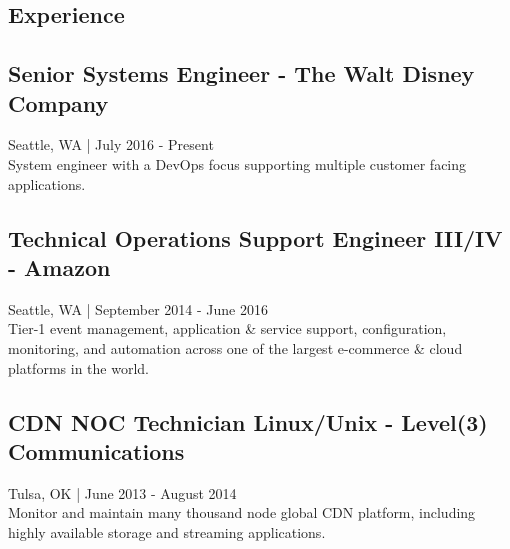 \documentclass[]{mv-resume}
\begin{document}
\begin{minipage}[t]{0.5\textwidth}
\begin{skills}
	\end{skills}
	\begin{experience}
		\hline
		\section*{Experience}
		\subsection*{Senior Systems Engineer - The Walt Disney Company}{Seattle, WA | July 2016 - Present}\\[4pt]
		{System engineer with a DevOps focus supporting multiple customer facing applications.}
		\subsection*{Technical Operations Support Engineer III/IV - Amazon}{Seattle, WA | September 2014 - June 2016}\\[4pt]
		{Tier-1 event management, application \& service support, configuration, monitoring, and automation across one of the largest e-commerce \& cloud platforms in the world.}
		\subsection*{CDN NOC Technician Linux/Unix - Level(3) Communications}{Tulsa, OK | June 2013 - August 2014}\\[4pt]
		{Monitor and maintain many thousand node global CDN platform, including highly available storage and streaming applications.}
	\end{experience}
	\end{minipage}
\end{document}
